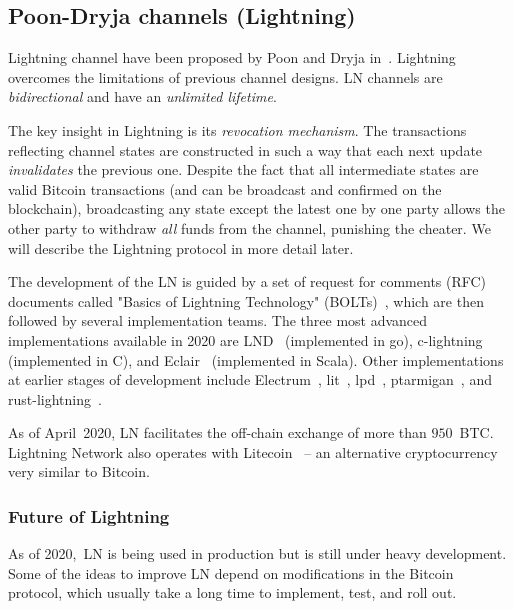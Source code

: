 \subsection{Poon-Dryja channels (Lightning)}

Lightning channel have been proposed by Poon and Dryja in~\cite{Poon2016}.
Lightning overcomes the limitations of previous channel designs.
LN channels are \textit{bidirectional} and have an \textit{unlimited lifetime}.

The key insight in Lightning is its \textit{revocation mechanism}.
The transactions reflecting channel states are constructed in such a way that each next update \textit{invalidates} the previous one.
Despite the fact that all intermediate states are valid Bitcoin transactions (and can be broadcast and confirmed on the blockchain), broadcasting any state except the latest one by one party allows the other party to withdraw \textit{all} funds from the channel, punishing the cheater.
We will describe the Lightning protocol in more detail later.


The development of the LN is guided by a set of request for comments (RFC) documents called "Basics of Lightning Technology" (BOLTs)~\cite{BOLT}, 
which are then followed by several implementation teams.
The three most advanced implementations available in 2020 are LND~\cite{LND} (implemented in go), c-lightning~\cite{clightning} (implemented in C), and Eclair~\cite{Eclair} (implemented in Scala).
Other implementations at earlier stages of development include
Electrum~\cite{ElectrumWebsite, ElectrumLightningAnnounce}, lit~\cite{lit}, lpd~\cite{lpd}, ptarmigan~\cite{ptarmigan}, and rust-lightning~\cite{rustlightning}.

As of April~2020, LN facilitates the off-chain exchange of more than $950$~BTC.
Lightning Network also operates with Litecoin~\cite{1MLLitecoin} -- an alternative cryptocurrency very similar to Bitcoin.

\subsubsection*{Future of Lightning}

As of 2020,~LN is being used in production but is still under heavy development.
Some of the ideas to improve LN depend on modifications in the Bitcoin protocol, which usually take a long time to implement, test, and roll out.

